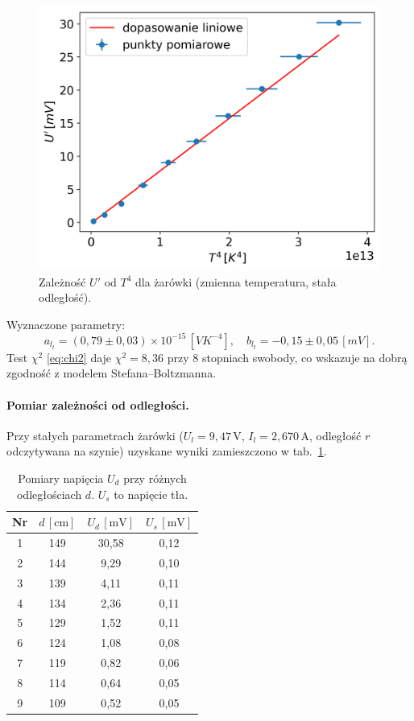 \documentclass[12pt]{article}
\begin{document}
\begin{figure}[H]
	\centering
	\includegraphics[scale=0.6]{boltzman_temp}
	\caption{Zależność $U'$ od $T^4$ dla żarówki (zmienna temperatura, stała odległość).}
	\label{fig:boltzman_temp}
\end{figure}

Wyznaczone parametry:
\[
	a_{l_t} = (0{,}79 \pm 0{,}03) \times 10^{-15}\,[VK^{-4}], 
	\quad 
	b_{l_t} = -0{,}15 \pm 0{,}05\,[mV].
\]
Test $\chi^2$ \eqref{eq:chi2} daje $\chi^2=8{,}36$ przy $8$ stopniach swobody, co wskazuje na dobrą zgodność z modelem Stefana–Boltzmanna.

\paragraph{Pomiar zależności od odległości.}
Przy stałych parametrach żarówki ($U_l=9{,}47\,\mathrm{V}$, $I_l=2{,}670\,\mathrm{A}$, odległość $r$ odczytywana na szynie) uzyskane wyniki zamieszczono w tab.~\ref{tab:distance_measurements}.

\begin{table}[H]
	\centering
	\begin{tabular}{c|c|c|c}
		\toprule
		Nr & $d\,[\mathrm{cm}]$ & $U_d\,[\mathrm{mV}]$ & $U_s\,[\mathrm{mV}]$ \\
		\midrule
		1  & 149 & 30{,}58 & 0{,}12 \\
		2  & 144 & 9{,}29  & 0{,}10 \\
		3  & 139 & 4{,}11  & 0{,}11 \\
		4  & 134 & 2{,}36  & 0{,}11 \\
		5  & 129 & 1{,}52  & 0{,}11 \\
		6  & 124 & 1{,}08  & 0{,}08 \\
		7  & 119 & 0{,}82  & 0{,}06 \\
		8  & 114 & 0{,}64  & 0{,}05 \\
		9  & 109 & 0{,}52  & 0{,}05 \\
		\bottomrule
	\end{tabular}
	\caption{Pomiary napięcia $U_d$ przy różnych odległościach $d$. $U_s$ to napięcie tła.}
	\label{tab:distance_measurements}
\end{table}
\end{document}
